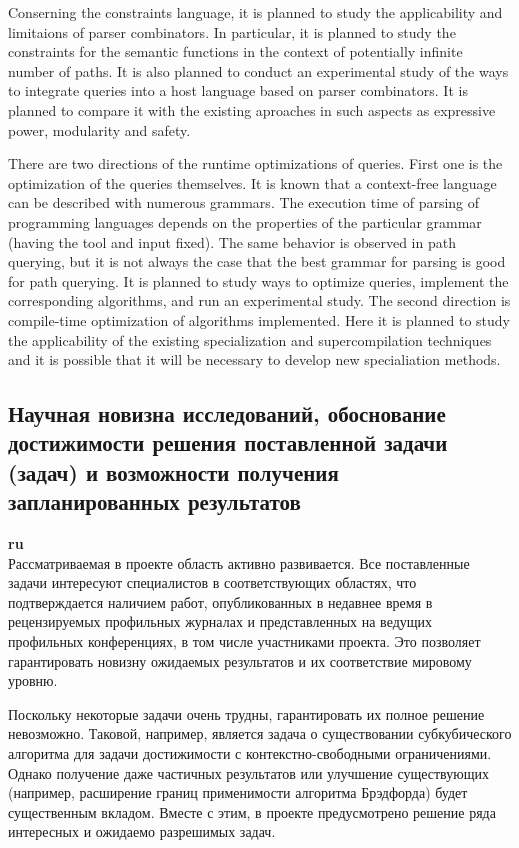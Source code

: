 \documentclass[12pt]{article}  %
\theoremstyle{remark}
\begin{document}
Conserning the constraints language, it is planned to study the applicability and limitaions of parser combinators.
In particular, it is planned to study the constraints for the semantic functions in the context of potentially infinite number of paths.
It is also planned to conduct an experimental study of the ways to integrate queries into a host language  based on parser combinators.
It is planned to compare it with the existing aproaches in such aspects as expressive power, modularity and safety.

There are two directions of the runtime optimizations of queries.
First one is the optimization of the queries themselves.
It is known that a context-free language can be described with numerous grammars.
The execution time of parsing of programming languages depends on the properties of the particular grammar (having the tool and input fixed).
The same behavior is observed in path querying, but it is not always the case that the best grammar for parsing is good for path querying.
It is planned to study ways to optimize queries, implement the corresponding algorithms, and run an experimental study.
The second direction is compile-time optimization of algorithms implemented.
Here it is planned to study the applicability of the existing specialization and supercompilation techniques and it is possible that it will be necessary to develop new specialiation methods.


\subsection{Научная новизна исследований, обоснование достижимости решения поставленной задачи (задач) и возможности получения запланированных результатов}

\textbf{ru}\\
%
Рассматриваемая в проекте область активно развивается. Все поставленные задачи интересуют специалистов в соответствующих областях, что подтверждается наличием работ, опубликованных в недавнее время в рецензируемых профильных журналах и представленных на ведущих профильных конференциях, в том числе участниками проекта. Это позволяет гарантировать новизну ожидаемых результатов и их соответствие мировому уровню.

Поскольку некоторые задачи очень трудны, гарантировать их полное решение невозможно. Таковой, например, является задача о существовании субкубического алгоритма для задачи достижимости с контекстно-свободными ограничениями. Однако получение даже частичных результатов или улучшение существующих (например, расширение границ применимости алгоритма Брэдфорда) будет существенным вкладом. Вместе с этим, в проекте предусмотрено решение ряда интересных и ожидаемо разрешимых задач.
\end{document}
